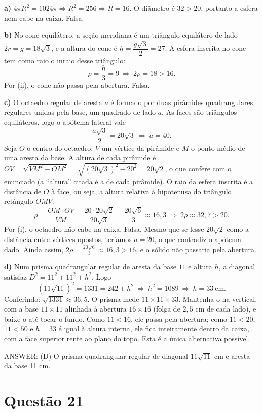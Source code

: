 \documentclass{article}%
\begin{document}
\textbf{a)} $4\pi R^2=1024\pi\Rightarrow R^2=256\Rightarrow R=16$. O diâmetro é $32>20$, portanto a esfera nem cabe na caixa. Falsa.

\textbf{b)} No cone equilátero, a seção meridiana é um triângulo equilátero de lado $2r=g=18\sqrt3$, e a altura do cone é $h=\dfrac{g\sqrt3}{2}=27$. A esfera inscrita no cone tem como raio o inraio desse triângulo:
\[
\rho=\frac{h}{3}=9\ \Rightarrow\ 2\rho=18>16 .
\]
Por (ii), o cone não passa pela abertura. Falsa.

\textbf{c)} O octaedro regular de aresta $a$ é formado por duas pirâmides quadrangulares regulares unidas pela base, um quadrado de lado $a$. As faces são triângulos equiláteros, logo o apótema lateral vale
\[
\frac{a\sqrt3}{2}=20\sqrt3\ \Rightarrow\ a=40 .
\]
Seja $O$ o centro do octaedro, $V$ um vértice da pirâmide e $M$ o ponto médio de uma aresta da base. A altura de cada pirâmide é $OV=\sqrt{VM^2-OM^2}=\sqrt{(20\sqrt3)^2-20^2}=20\sqrt2$, o que confere com o enunciado (a ``altura'' citada é a de cada pirâmide). O raio da esfera inscrita é a distância de $O$ à face, ou seja, a altura relativa à hipotenusa do triângulo retângulo $OMV$:
\[
\rho=\frac{OM\cdot OV}{VM}=\frac{20\cdot 20\sqrt2}{20\sqrt3}=\frac{20\sqrt6}{3}\approx 16{,}3
\ \Rightarrow\ 2\rho\approx 32{,}7>20 .
\]
Por (i), o octaedro não cabe na caixa. Falsa. Mesmo que se lesse $20\sqrt2$ como a distância entre vértices opostos, teríamos $a=20$, o que contradiz o apótema dado. Ainda assim, $2\rho=\frac{20\sqrt6}{3}\approx16{,}3>16$, e o sólido não passaria pela abertura.

\textbf{d)} Num prisma quadrangular regular de aresta da base $11$ e altura $h$, a diagonal satisfaz $D^2=11^2+11^2+h^2$. Logo
\[
(11\sqrt{11})^2=1331=242+h^2\ \Rightarrow\ h^2=1089\ \Rightarrow\ h=33\ \text{cm}.
\]
Conferindo: $\sqrt{1331}\approx 36{,}5$. O prisma mede $11\times 11\times 33$. Mantenha-o na vertical, com a base $11\times 11$ alinhada à abertura $16\times 16$ (folga de $2{,}5$ cm de cada lado), e baixe-o até tocar o fundo. Como $11<16$, ele passa pela abertura; como $11<20$, $11<50$ e $h=33$ é igual à altura interna, ele fica inteiramente dentro da caixa, com a face superior rente ao plano do topo. Esta é a única alternativa possível.

ANSWER: (D) O prisma quadrangular regular de diagonal $11\sqrt{11}$ cm e aresta da base 11 cm.%
\newpage%
\section*{Questão 21}
\end{document}
